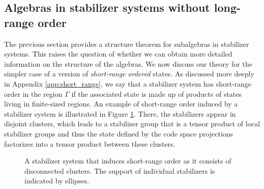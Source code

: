 \documentclass[aps,pra,reprint,superscriptaddress]{revtex4-2}
\newcommand\G{\Gamma}
\newcommand\x{\xi}
\newcommand\y{\psi}
\theoremstyle{definition}
\theoremstyle{remark}
\begin{document}
\subsection{Algebras in stabilizer systems without long-range order}\label{sec:short-range-thm}
The previous section provides a structure theorem for subalgebras in stabilizer systems. This raises the question of whether we can obtain more detailed information on the structure of the algebras.
We now discuss our theory for the simpler case of a version of \emph{short-range ordered}
states. As discussed more deeply in Appendix \ref{app:short_range}, we say that a stabilizer system has short-range order in the region $\G$ if the associated state
is made up of products of states living in finite-sized regions. An example of short-range order induced by a stabilizer system is illustrated in Figure \ref{fig:stabilizers-short-range-order}. There, the stabilizers appear in disjoint clusters, which leads to a stabilizer group that is a tensor product of local stabilizer groups and thus the state defined by the code space projections factorizes into a tensor product between these clusters.
\begin{figure}[ht]
\caption{A stabilizer system that induces short-range order as it consists of disconnected clusters. The support of individual stabilizers is indicated by ellipses.}
\label{fig:stabilizers-short-range-order}
\end{figure}
\end{document}
